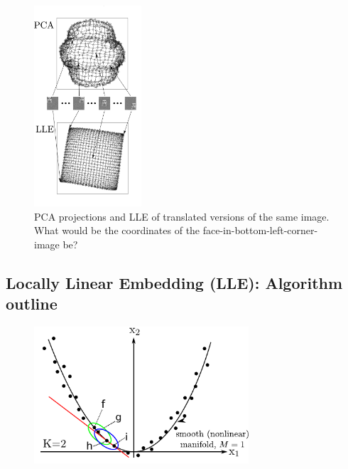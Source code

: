 \begin{frame}
 
\begin{figure}[ht]
	\centering
    \includegraphics[width=4cm]{img/fig3_lle_intro_cropped.png}
	\caption{PCA projections and LLE of translated versions of the same image. What would be the coordinates of the face-in-bottom-left-corner-image be?}
	\label{fig:faces_translated_pca_lle}
\end{figure}
\end{frame}

\begin{frame}
\section{Locally Linear Embedding (LLE): Algorithm outline}

\begin{figure}[ht]
	\centering
    \includegraphics[width=8cm]{img/section4_fig11_K2}
	\label{fig:tangentialk2}
\end{figure}

\end{frame}

